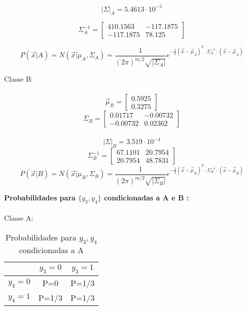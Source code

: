 \documentclass[a4paper,12pt]{article} %
\begin{document}
\begin{enumerate}
\begin{enumerate}
\begin{equation*} 
    |\Sigma|_A = 5.4613 \cdot 10^{-5}
\end{equation*}

\begin{equation*} 
\Sigma^{-1}_A = \begin{bmatrix} 410.1563 & -117.1875 \\ -117.1875 & 78.125 \end{bmatrix}
\end{equation*}

\begin{equation*}
    P(\vec{x}|A) = N(\vec{x}|\mu_{A},\Sigma_{A}) = \frac{1}{(2\pi)^{m/2} \sqrt{|\Sigma_{A}|}}e^{-\frac{1}{2}(\vec{x}-\vec{\mu}_A)^T \cdot \Sigma_A^{-1} \cdot (\vec{x}-\vec{\mu}_A)}
\end{equation*}

Classe B: \\ \\ 
\begin{equation*}
    \vec{\mu}_B = \begin{bmatrix} 0.5925 \\ 0.3275 \end{bmatrix}  
\end{equation*}
\begin{equation*}
    \Sigma_B = \begin{bmatrix} 0.01717 & -0.00732 \\ -0.00732 & 0.02362 \end{bmatrix} 
\end{equation*} \\
\begin{equation*}
    |\Sigma|_B = 3.519 \cdot 10^{-4} 
\end{equation*}
\begin{equation*}
    \Sigma^{-1}_B = \begin{bmatrix} 67.1101 & 20.7954 \\ 20.7954 & 48.7831 \end{bmatrix}
\end{equation*}
\begin{equation*}
    P(\vec{x}|B) = N(\vec{x}|\mu_{B},\Sigma_{B}) = \frac{1}{(2\pi)^{m/2} \sqrt{|\Sigma_{B}|}}e^{-\frac{1}{2}(\vec{x}-\vec{\mu}_B)^T \cdot \Sigma_B^{-1} \cdot (\vec{x}-\vec{\mu}_B)}
\end{equation*}


\textbf{Probabilidades para $\{y_3,y_4\}$ condicionadas a A e B :}
\\ \\
Classe A:
\begin{table}[H]
\centering
\begin{tabular}{c|c|c|} 
    \cline{2-3}
                                 & $y_3=0$ & $y_3=1$ \\ \hline
    \multicolumn{1}{|c|}{$y_4=0$} & P=0    & P=1/3  \\ \hline
    \multicolumn{1}{|c|}{$y_4=1$} & P=1/3  & P=1/3  \\ \hline
    \end{tabular}
    \caption{Probabilidades para ${y_3,y_4}$ condicionadas a A}
\end{table}


\end{enumerate}
\end{enumerate}
\end{document}
